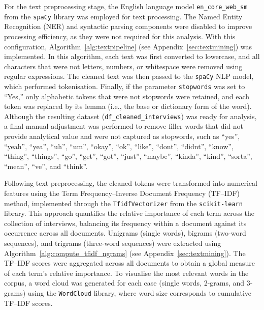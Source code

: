\documentclass[a4paper, 12pt, twoside]{report}  %
\begin{document}
\indent For the text preprocessing stage, the English language model \texttt{en\_core\_web\_sm} from the \texttt{spaCy} library was employed for text processing. The Named Entity Recognition (NER) and syntactic parsing components were disabled to improve processing efficiency, as they were not required for this analysis. With this configuration, Algorithm~\ref{alg:textpipeline} (see Appendix~\ref{sec:textmining}) was implemented. In this algorithm, each text was first converted to lowercase, and all characters that were not letters, numbers, or whitespace were removed using regular expressions. The cleaned text was then passed to the \texttt{spaCy} NLP model, which performed tokenisation. Finally, if the parameter \texttt{stopwords} was set to ``Yes,” only alphabetic tokens that were not stopwords were retained, and each token was replaced by its lemma (i.e., the base or dictionary form of the word). Although the resulting dataset (\texttt{df\_cleaned\_interviews}) was ready for analysis, a final manual adjustment was performed to remove filler words that did not provide analytical value and were not captured as stopwords, such as ``yes”, ``yeah”, ``yea”, ``uh”, ``um”, ``okay”, ``ok”, ``like”, ``dont”, ``didnt”, ``know”, ``thing”, ``things”, ``go”, ``get”, ``got”, ``just”, ``maybe”, ``kinda”, ``kind”, ``sorta”, ``mean”, ``ve”, and ``think”.

\indent Following text preprocessing, the cleaned tokens were transformed into numerical features using the Term Frequency–Inverse Document Frequency (TF–IDF) method, implemented through the \texttt{TfidfVectorizer} from the \texttt{scikit-learn} library. This approach quantifies the relative importance of each term across the collection of interviews, balancing its frequency within a document against its occurrence across all documents. Unigrams (single words), bigrams (two-word sequences), and trigrams (three-word sequences) were extracted using Algorithm~\ref{alg:compute_tfidf_ngrams} (see Appendix~\ref{sec:textmining}). The TF–IDF scores were aggregated across all documents to obtain a global measure of each term’s relative importance. To visualise the most relevant words in the corpus, a word cloud was generated for each case (single words, 2-grams, and 3-grams) using the \texttt{WordCloud} library, where word size corresponds to cumulative TF–IDF scores.
\end{document}
